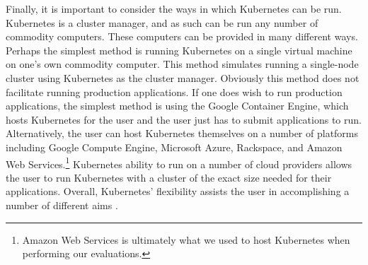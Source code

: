 Finally, it is important to consider the ways in which Kubernetes can be run.
Kubernetes is a cluster manager, and as such can be run any number of commodity
computers. These computers can be provided in many different ways. Perhaps the
simplest method is running Kubernetes on a single virtual machine on one's own
commodity computer. This method simulates running a single-node cluster using
Kubernetes as the cluster manager. Obviously this method does not facilitate
running production applications. If one does wish to run production
applications, the simplest method is using the Google Container Engine, which
hosts Kubernetes for the user and the user just has to submit applications to
run. Alternatively, the user can host Kubernetes themselves on a number of
platforms including Google Compute Engine, Microsoft Azure, Rackspace, and
Amazon Web Services.\footnote{Amazon Web Services is ultimately what we used to
host Kubernetes when performing our evaluations.}
Kubernetes ability to run on a number of cloud providers
allows the user to run Kubernetes with a cluster of the exact size needed for
their applications. Overall, Kubernetes' flexibility assists the user in
accomplishing a number of different aims \cite{getting-started-k8s}.
